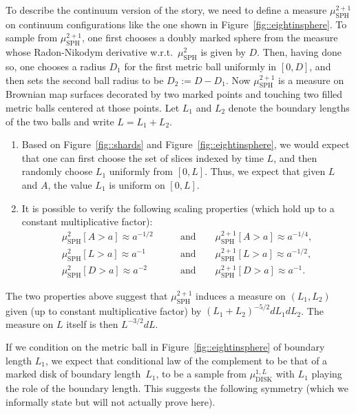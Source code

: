 \documentclass[10pt]{amsart}
\theoremstyle{plain}
\numberwithin{theorem}{section}
\theoremstyle{definition}
\newcommand{\mustwo}{\mu_{\mathrm{SPH}}^2}
\newcommand{\mustwoplusone}{\mu_{\mathrm{SPH}}^{2+1}}
\newcommand{\mudonel}{\mu_{ \mathrm{DISK}}^{1, L}}
\begin{document}
To describe the continuum version of the story, we need to define a measure $\mustwoplusone$ on continuum configurations like the one shown in Figure~\ref{fig::eightinsphere}. To sample from $\mustwoplusone$, one first chooses a doubly marked sphere from the measure whose Radon-Nikodym derivative w.r.t.\ $\mustwo$ is given by $D$. Then, having done so, one chooses a radius $D_1$ for the first metric ball uniformly in $[0,D]$, and then sets the second ball radius to be $D_2 := D-D_1$. Now $\mustwoplusone$ is a measure on Brownian map surfaces decorated by two marked points and touching two filled metric balls centered at those points. Let $L_1$ and $L_2$ denote the boundary lengths of the two balls and write $L = L_1 + L_2$.

\begin{enumerate}
\item Based on Figure~\ref{fig::shards} and Figure~\ref{fig::eightinsphere}, we would expect that one can first choose the set of slices indexed by time $L$, and then randomly choose $L_1$ uniformly from $[0,L]$. Thus, we expect that given $L$ and $A$, the value $L_1$ is uniform on $[0,L]$.
\item It is possible to verify the following scaling properties (which hold up to a constant multiplicative factor):
\begin{align*}
\mustwo[ A > a] \approx a^{-1/2} \quad\quad&\mathrm{and}\quad\quad \mustwoplusone[ A > a ] \approx a^{-1/4},\\
\mustwo[ L > a ] \approx a^{-1} \quad\quad&\mathrm{and}\quad\quad \mustwoplusone[ L > a ] \approx a^{-1/2}, \\
\mustwo[ D > a ] \approx a^{-2} \quad\quad&\mathrm{and}\quad\quad \mustwoplusone [ D > a ] \approx a^{-1}.
\end{align*}
\end{enumerate}

The two properties above suggest that $\mustwoplusone$ induces a measure on $(L_1, L_2)$ given (up to constant multiplicative factor) by $(L_1 + L_2)^{-5/2}dL_1 dL_2$. The measure on $L$ itself is then $L^{-3/2} dL$.

If we condition on the metric ball in Figure~\ref{fig::eightinsphere} of boundary length $L_1$, we expect that conditional law of the complement to be that of a marked disk of boundary length~$L_1$, \ie to be a sample from $\mudonel$ with $L_1$ playing the role of the boundary length. This suggests the following symmetry (which we informally state but will not actually prove here).
\end{document}
